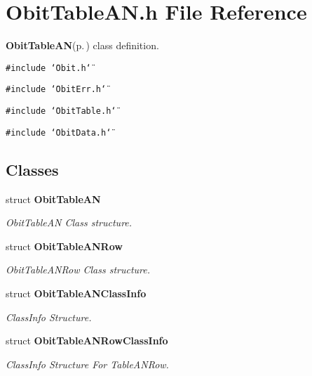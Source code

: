 \section{Obit\-Table\-AN.h File Reference}
\label{ObitTableAN_8h}
{\bf Obit\-Table\-AN}{\rm (p.\,\pageref{structObitTableAN})} class definition. 

{\tt \#include \char`\"{}Obit.h\char`\"{}}\par
{\tt \#include \char`\"{}Obit\-Err.h\char`\"{}}\par
{\tt \#include \char`\"{}Obit\-Table.h\char`\"{}}\par
{\tt \#include \char`\"{}Obit\-Data.h\char`\"{}}\par
\subsection*{Classes}
\begin{CompactItemize}
\item 
struct {\bf Obit\-Table\-AN}
\begin{CompactList}\small\item\em Obit\-Table\-AN Class structure. \item\end{CompactList}\item 
struct {\bf Obit\-Table\-ANRow}
\begin{CompactList}\small\item\em Obit\-Table\-ANRow Class structure. \item\end{CompactList}\item 
struct {\bf Obit\-Table\-ANClass\-Info}
\begin{CompactList}\small\item\em Class\-Info Structure. \item\end{CompactList}\item 
struct {\bf Obit\-Table\-ANRow\-Class\-Info}
\begin{CompactList}\small\item\em Class\-Info Structure For Table\-ANRow. \item\end{CompactList}\end{CompactItemize}

